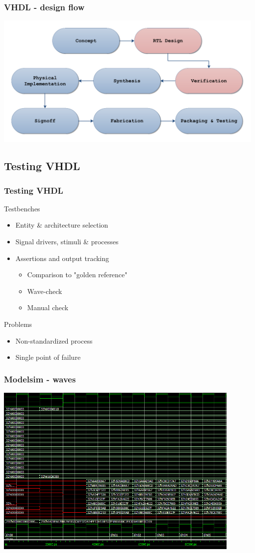 \documentclass[british,10pt]{beamer}
\begin{document}
\begin{frame}\frametitle{VHDL - design flow}
\includegraphics[width=\textwidth]{images/VHDLflow.pdf}
\end{frame}

\subsection{Testing VHDL}

\begin{frame}\frametitle{Testing VHDL}
Testbenches
\begin{itemize}
\item Entity \& architecture selection
\item Signal drivers, stimuli \& processes
\item Assertions and output tracking
\begin{itemize}
\item Comparison to "golden reference"
\item Wave-check
\item Manual check
\end{itemize}
\end{itemize}
\vspace{0.25cm}
Problems
\begin{itemize}
\item Non-standardized process
\item Single point of failure
\end{itemize}
\end{frame}

\begin{frame}\frametitle{Modelsim - waves}
\centering
\includegraphics[width=0.9\textwidth]{images/waves.png}
\end{frame}
\end{document}
